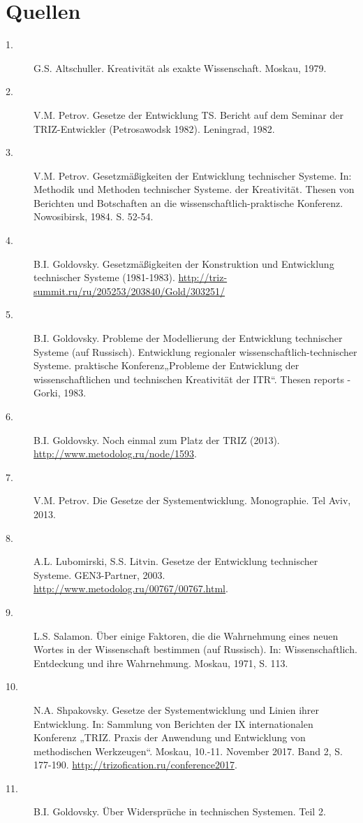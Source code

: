 \documentclass[11pt,a4paper]{article}
\begin{document}
\section*{Quellen}
\begin{description}
\item[1.] G.S. Altschuller. Kreativität als exakte Wissenschaft. Moskau, 1979.
\item[2.] V.M. Petrov. Gesetze der Entwicklung TS. Bericht auf dem Seminar der
  TRIZ-Entwickler (Petrosawodsk 1982). Leningrad, 1982.
\item[3.] V.M. Petrov. Gesetzmäßigkeiten der Entwicklung technischer Systeme.
  In: Methodik und Methoden technischer Systeme.  der Kreativität. Thesen von
  Berichten und Botschaften an die wissenschaftlich-praktische Konferenz.
  Nowosibirsk, 1984. S. 52-54.
\item[4.] B.I. Goldovsky. Gesetzmäßigkeiten der Konstruktion und Entwicklung
  technischer Systeme (1981-1983).
  \url{http://triz-summit.ru/ru/205253/203840/Gold/303251/} 
\item[5.] B.I. Goldovsky. Probleme der Modellierung der Entwicklung
  technischer Systeme (auf Russisch).  Entwicklung regionaler
  wissenschaftlich-technischer Systeme.  praktische Konferenz„Probleme der
  Entwicklung der wissenschaftlichen und technischen Kreativität der
  ITR“. Thesen reports - Gorki, 1983.
\item[6.] B.I. Goldovsky. Noch einmal zum Platz der TRIZ (2013).
  \url{http://www.metodolog.ru/node/1593}. 
\item[7.] V.M. Petrov. Die Gesetze der Systementwicklung. Monographie. Tel
  Aviv, 2013.
 \item[8.] A.L. Lubomirski, S.S. Litvin. Gesetze der Entwicklung technischer
   Systeme. GEN3-Partner, 2003.
   \url{http://www.metodolog.ru/00767/00767.html}. 
\item[9.] L.S. Salamon. Über einige Faktoren, die die Wahrnehmung eines neuen
  Wortes in der Wissenschaft bestimmen (auf Russisch). In: Wissenschaftlich.
  Entdeckung und ihre Wahrnehmung. Moskau, 1971, S. 113.
\item[10.] N.A. Shpakovsky. Gesetze der Systementwicklung und Linien ihrer
  Entwicklung. In: Sammlung von Berichten der IX internationalen Konferenz
 „TRIZ. Praxis der Anwendung und Entwicklung von methodischen Werkzeugen“.
  Moskau, 10.-11. November 2017. Band 2, S. 177-190.
  \url{http://trizofication.ru/conference2017}. 
\item[11.] B.I. Goldovsky. Über Widersprüche in technischen Systemen. Teil 2.

\end{description}
\end{document}
